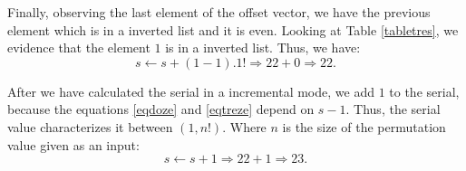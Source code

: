 \documentclass {amsart}
\begin{document}
Finally, observing the last element of the offset vector, we have
the previous element which is in a inverted list and it is even.
Looking at Table \ref{tabletres}, we evidence that the element
{$1$} is in a inverted list. Thus, we have:
\begin{equation}
s \leftarrow s + (1 - 1) . 1! \Rightarrow 22 + 0 \Rightarrow 22.
\end{equation}

After we have calculated the serial in a incremental mode, we add
{$1$} to the serial, because the equations \ref{eqdoze} and
\ref{eqtreze} depend on {$s-1$}. Thus, the serial value
characterizes it between {$(1, n!)$}. Where {$n$} is the size of
the permutation value given as an input:
\begin{equation}
s \leftarrow s + 1 \Rightarrow 22 + 1 \Rightarrow 23.
\end{equation}
\end{document}
